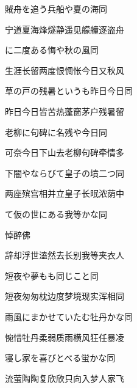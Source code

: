 \begin{haiku}
    {\FH 賊舟を追う兵船や夏の海}\hfill{\FH 同}

    {\FK 宁道夏海烽燧静遥见艨艟逐盗舟}
\end{haiku}

\begin{haiku}
    {\FH {}に二度ある悔や秋の風}\hfill{\FH 同}

    {\FK 生涯长留两度恨惆怅今日又秋风}
\end{haiku}

\begin{haiku}
    {\FH 草の戸の残暑というも昨日今日}\hfill{\FH 同}

    {\FK 昨日今日皆苦热蓬窗茅户残暑留}
\end{haiku}

\begin{haiku}
    {\FH 老柳に句碑に名残や今日}\hfill{\FH 同}

    {\FK 可奈今日下山去老柳句碑牵情多}
\end{haiku}

\begin{haiku}
    {\FH 下闇やならびて皇子の墳二つ}\hfill{\FH 同}

    {\FK 两座殡宫相并立皇子长眠浓荫中}
\end{haiku}

\begin{haiku}
    {\FH {}て仮の世にある我等かな}\hfill{\FH 同}

    {\FK 悼醉佛}

    {\FK 辞却浮世溘然去长别我等夹衣人}
\end{haiku}

\begin{haiku}
    {\FH 短夜や夢もも同じこと}\hfill{\FH 同}

    {\FK 短夜匆匆枕边度梦境现实浑相同}
\end{haiku}

\begin{haiku}
    {\FH 雨風にまかせていたむ牡丹かな}\hfill{\FH 同}

    {\FK 惋惜牡丹柔弱质雨横风狂任暴凌}
\end{haiku}

\begin{haiku}
    {\FH 寝し家を喜びとべる蛍かな}\hfill{\FH 同}

    {\FK 流萤陶陶复欣欣只向入梦人家飞}
\end{haiku}

